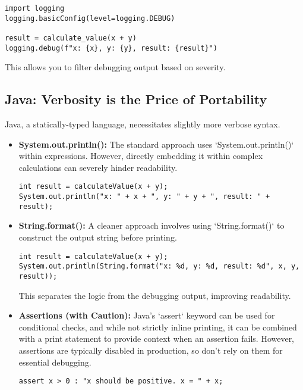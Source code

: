 \documentclass{article}
\begin{document}
{{{{\begin{itemize}
\begin{verbatim}
import logging
logging.basicConfig(level=logging.DEBUG)

result = calculate_value(x + y)
logging.debug(f"x: {x}, y: {y}, result: {result}")
\end{verbatim}

        This allows you to filter debugging output based on severity.
\end{itemize}

\subsection*{Java: Verbosity is the Price of Portability}

Java, a statically-typed language, necessitates slightly more verbose syntax.

\begin{itemize}
    \item \textbf{System.out.println():} The standard approach uses `System.out.println()` within expressions. However, directly embedding it within complex calculations can severely hinder readability.

\begin{verbatim}
int result = calculateValue(x + y);
System.out.println("x: " + x + ", y: " + y + ", result: " + result);
\end{verbatim}

    \item \textbf{String.format():} A cleaner approach involves using `String.format()` to construct the output string before printing.

\begin{verbatim}
int result = calculateValue(x + y);
System.out.println(String.format("x: %d, y: %d, result: %d", x, y, result));
\end{verbatim}

        This separates the logic from the debugging output, improving readability.

    \item \textbf{Assertions (with Caution):} Java's `assert` keyword can be used for conditional checks, and while not strictly inline printing, it can be combined with a print statement to provide context when an assertion fails. However, assertions are typically disabled in production, so don't rely on them for essential debugging.

\begin{verbatim}
assert x > 0 : "x should be positive. x = " + x;
\end{verbatim}
\end{itemize}

}}}}
\end{document}
